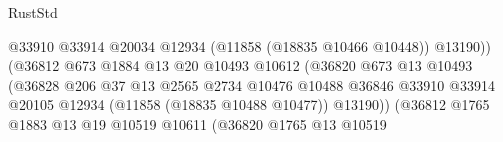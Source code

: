 \begin{lexlean}{RustStd}
\begin{coremodule}
                                                      @33910
                                                      @33914
                                                      @20034
                                                      @12934
                                                      (@11858 (@18835 @10466 @10448))
                                                      @13190))
                                                  (@36812
                                                    @673
                                                    @1884
                                                    @13
                                                    @20
                                                    @10493
                                                    @10612
                                                    (@36820
                                                      @673
                                                      @13
                                                      @10493
                                                      (@36828
                                                        @206
                                                        @37
                                                        @13
                                                        @2565
                                                        @2734
                                                        @10476
                                                        @10488
                                                        @36846
                                                        @33910
                                                        @33914
                                                        @20105
                                                        @12934
                                                        (@11858 (@18835 @10488 @10477))
                                                        @13190))
                                                    (@36812
                                                      @1765
                                                      @1883
                                                      @13
                                                      @19
                                                      @10519
                                                      @10611
                                                      (@36820
                                                        @1765
                                                        @13
                                                        @10519

\end{coremodule}
\end{lexlean}
